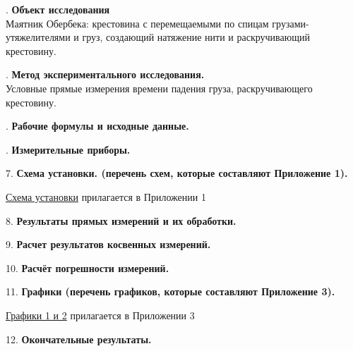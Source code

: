 \documentclass[12pt]{article}
\begin{document}
    \mediumvspace

    . \textbf{Объект исследования} \\
    Маятник Обербека: крестовина с перемещаемыми по спицам грузами-утяжелителями и груз, создающий натяжение нити и раскручивающий крестовину.

    \mediumvspace

    . \textbf{Метод экспериментального исследования.} \\
    Условные прямые измерения времени падения груза, раскручивающего крестовину.

    \newpage    

    . \textbf{Рабочие формулы и исходные данные.}

    

    \mediumvspace

    . \textbf{Измерительные приборы.}

    \smallvspace

    

    \mediumvspace

    7. \textbf{Схема установки. (перечень схем, которые составляют Приложение 1).}

    \hyperlink{schema1}{Схема установки} прилагается в Приложении 1

    \mediumvspace

    8. \textbf{Результаты прямых измерений и их обработки.}

    

    \mediumvspace

    9. \textbf{Расчет результатов косвенных измерений.}

    

    \mediumvspace

    10. \textbf{Расчёт погрешности измерений.}

    

    \mediumvspace

    11. \textbf{Графики (перечень графиков, которые составляют Приложение 3).}

    \hyperlink{diagram1}{Графики 1 и 2} прилагается в Приложении 3

    \mediumvspace

    12. \textbf{Окончательные результаты.}

    
\end{document}

